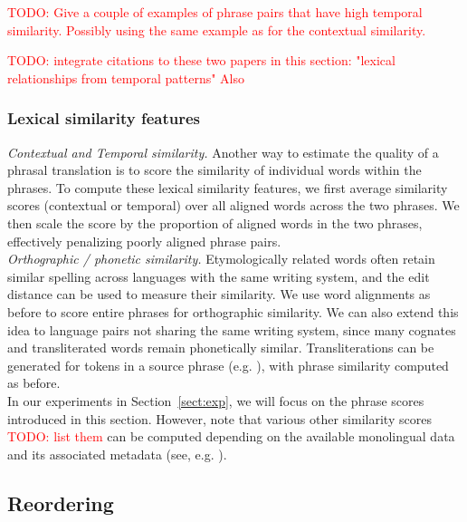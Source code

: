\documentclass[11pt]{article}
\newcommand{\mnote}[1]{\marginpar{%
  \vskip-\baselineskip
  \raggedright\footnotesize
  \itshape\hrule\smallskip\tiny{#1}\par\smallskip\hrule}}
\newcommand{\mtodo}[1]{\mnote{\textcolor{red}{#1}}}
\newcommand{\todo}[1]{\textcolor{red}{TODO: #1}}
\newcommand{\secref}[1]{Section~\ref{#1}}
\begin{document}
\todo{Give a couple of examples of phrase pairs that have high temporal similarity.  Possibly using the same example as for the contextual similarity.}

\todo{integrate citations to these two papers in this section: 
"lexical relationships from temporal patterns"
\cite{alfonseca-ciaramita-hall:2009:EMNLP}
Also
\cite{Schafer:2002}}

\subsubsection{Lexical similarity features}  \label{sect:lexfeats}

\noindent\emph{Contextual and Temporal similarity.}  Another way to estimate the quality of a phrasal translation is to score the similarity of individual words within the phrases.  To compute these lexical similarity features, we first average similarity scores (contextual or temporal) over all aligned words across the two phrases.  We then scale the score by the proportion of aligned words in the two phrases, effectively penalizing poorly aligned phrase pairs.\mtodo{Mention that it is the average of both forward and backward alignments?}\\

\noindent\emph{Orthographic / phonetic similarity.} Etymologically related words often retain similar spelling across languages with the same writing system, and the edit distance can be used to measure their similarity.  We use word alignments as before to score entire phrases for orthographic similarity.\mtodo{Not done quite the same as above but will glance over it.} We can also extend this idea to language pairs not sharing the same writing system, since many cognates and transliterated words remain phonetically similar.  Transliterations can be generated for tokens in a source phrase (e.g. \cite{Virga:2003}), with phrase similarity computed as before.\\

In our experiments in \secref{sect:exp}, we will focus on the phrase scores introduced in this section.  However, note that various other similarity scores \todo{list them} can be computed depending on the available monolingual data and its associated metadata (see, e.g. ).

\subsection{Reordering} \label{sect:order}
\end{document}
